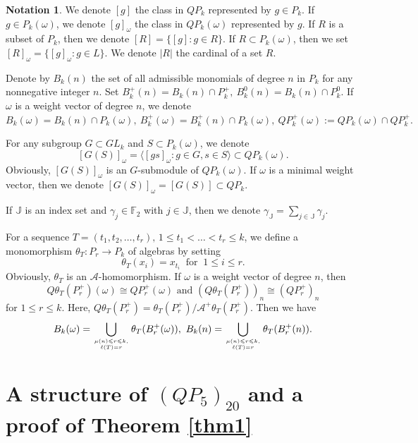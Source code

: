 \documentclass[reqno]{amsart}
\theoremstyle{plain}
\theoremstyle{definition}
\theoremstyle{plain}
\theoremstyle{definition}
\newtheorem{notas}[thms]{Notation}
\numberwithin{equation}{section}
\begin{document}
\begin{notas} We denote $[g]$ the class in $QP_k$ represented by $g\in P_k$. If $g \in  P_k(\omega)$, we denote $[g]_\omega$ the class in $QP_k(\omega)$ represented by $g$. 
If $R$ is a subset of $P_k$, then we denote $[R] = \{[g] : g \in R\}$. If $R \subset P_k(\omega)$, then we set $[R]_\omega = \{[g]_\omega : g \in L\}$. We denote $|R|$ the cardinal of a set $R$.
	
Denote by $B_{k}(n)$ the set of all admissible monomials of degree $n$ in $P_k$ for any nonnegative integer $n$. Set 
$B_{k}^+(n) = B_{k}(n)\cap P_k^+,\ B_{k}^0(n) = B_{k}(n)\cap P_k^0.$
If $\omega$ is a weight vector of degree $n$, we denote 
$B_k(\omega) = B_{k}(n)\cap P_k(\omega),\ B_k^+(\omega) = B_{k}^+(n)\cap P_k(\omega),\ QP_k^+(\omega) := QP_k(\omega)\cap QP_k^+.$

For any subgroup $G \subset GL_k$ and $S \subset P_k(\omega)$, we denote
$$[G(S)]_\omega = \langle [gs]_\omega : g \in G, s \in S\rangle \subset QP_k(\omega).$$ 
Obviously, $[G(S)]_\omega$ is an $G$-submodule of $QP_k(\omega)$. If $\omega$ is a minimal weight vector, then we denote $[G(S)]_\omega = [G(S)]\subset QP_k$.

If $\mathbb J$ is an index set and $\gamma_j \in \mathbb F_2$ with $j \in \mathbb J$, then we denote $\gamma_{\mathbb J} = \sum_{j\in \mathbb J}\gamma_j$.
\end{notas}

For a sequence $T= (t_1, t_2, \ldots, t_r),\, 1 \leqslant t_1 <\ldots < t_r \leqslant k$, we define a monomorphism $\theta_T: P_r \to P_k$ of algebras by setting 
\begin{equation}\label{ctbs}
\theta_T(x_i) = x_{t_i} \ \mbox{ for } \ 1 \leqslant i \leqslant r.
\end{equation} 
Obviously, $\theta_T$ is an $\mathcal A$-homomorphism. If $\omega$ is a weight vector of degree $n$, then 
\[Q\theta_T(P_r^+)(\omega) \cong  QP_r^+(\omega)\mbox{ and } (Q\theta_T(P_r^+))_n \cong (QP_r^+)_n\] 
for $1 \leqslant r \leqslant k$. Here, $Q\theta_T(P_r^+) = \theta_T(P_r^+)/\mathcal A^+\theta_T(P_r^+)$. Then we have
\begin{equation}\label{ctbs2}
B_k(\omega) = \bigcup_{\mu(n) \leqslant r\leqslant k,\atop \ell(T)=r} \theta_T(B_r^+(\omega)),\ B_k(n) = \bigcup_{\mu(n) \leqslant r\leqslant k,\atop \ell(T)=r} \theta_T(B_r^+(n)).
\end{equation}


\section{A structure of $(QP_5)_{20}$ and a proof of Theorem \ref{thm1}}\label{s3}
\setcounter{equation}{0}
\end{document}
